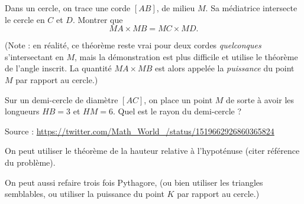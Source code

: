 \begin{exo}
Dans un cercle, on trace une corde $[AB]$, de milieu $M$. Sa médiatrice intersecte le cercle en $C$ et $D$.
Montrer que
\[ MA\times MB = MC\times MD.\]
\begin{center}
\end{center}
(Note : en réalité, ce théorème reste vrai pour deux cordes \emph{quelconques} s'intersectant en $M$, mais la démonstration est plus difficile et utilise le théorème de l'angle inscrit. La quantité $MA\times MB$ est alors appelée la \emph{puissance} du point $M$ par rapport au cercle.)
\end{exo}









\begin{exo}
Sur un demi-cercle de diamètre $[AC]$, on place un point $M$ de sorte à avoir les longueurs $HB=3$ et $HM=6$. Quel est le rayon du demi-cercle ?
\begin{center}
\end{center}
\begin{sol}
Source : \url{https://twitter.com/Math_World_/status/1519662926860365824}

On peut utiliser le théorème de la hauteur relative à l'hypoténuse (citer référence du problème).

On peut aussi refaire trois fois Pythagore, (ou bien utiliser les triangles semblables, ou utiliser la puissance du point $K$ par rapport au cercle.)
\end{sol}
\end{exo}







